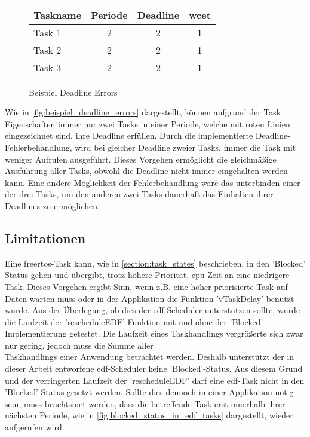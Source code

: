 \documentclass[../EDF Master Thesis.tex]{subfiles}
\begin{document}
\begin{figure}[H]
\\
        \vspace {1cm}
        \begin{tabular}{l|c|c|c}
            Taskname & Periode & Deadline & \ac{wcet} \\
            \hline
            Task 1 & 2 & 2 & 1 \\
            Task 2 & 2 & 2 & 1 \\
            Task 3 & 2 & 2 & 1 
        \end{tabular}
        \caption{Beispiel Deadline Errors}
        \label{fig:beispiel_deadline_errors}
    \end{figure}

    Wie in \autoref{fig:beispiel_deadline_errors} dargestellt, können aufgrund der Task Eigenschaften immer nur zwei Tasks in einer Periode, welche mit roten Linien eingezeichnet sind, ihre Deadline erfüllen.
    Durch die implementierte Deadline-Fehlerbehandlung, wird bei gleicher Deadline zweier Tasks, immer die Task mit weniger Aufrufen ausgeführt.
    Dieses Vorgehen ermöglicht die gleichmäßige Ausführung aller Tasks, obwohl die Deadline nicht immer eingehalten werden kann.
    Eine andere Möglichkeit der Fehlerbehandlung wäre das unterbinden einer der drei Tasks, um den anderen zwei Tasks dauerhaft das Einhalten ihrer Deadlines zu ermöglichen.

\clearpage

\subsection{Limitationen} \label{section:limitationen}

    Eine \ac{freertos}-Task kann, wie in \autoref{section:task_states} beschrieben, in den 'Blocked' Status gehen und übergibt, trotz höhere Priorität, \ac{cpu}-Zeit an eine niedrigere Task.
    Dieses Vorgehen ergibt Sinn, wenn z.B. eine höher priorisierte Task auf Daten warten muss oder in der Applikation die Funktion 'vTaskDelay' benutzt wurde.
    Aus der Überlegung, ob dies der \ac{edf}-Scheduler unterstützen sollte, wurde die Laufzeit der 'rescheduleEDF'-Funktion mit und ohne der 'Blocked'-Implementierung getestet.
    Die Laufzeit eines Taskhandlings vergrößerte sich zwar nur gering, jedoch muss die Summe aller \\Taskhandlings einer Anwendung betrachtet werden.
    Deshalb unterstützt der in dieser Arbeit entworfene \ac{edf}-Scheduler keine 'Blocked'-Status.
    Aus diesem Grund und der verringerten Laufzeit der 'rescheduleEDF' darf eine \ac{edf}-Task nicht in den 'Blocked' Status gesetzt werden.  
    Sollte dies dennoch in einer Applikation nötig sein, muss beachtsinet werden, dass die betreffende Task erst innerhalb ihrer nächsten Periode, wie in \autoref{fig:blocked_status_in_edf_tasks} dargestellt, wieder aufgerufen wird.
\end{document}
